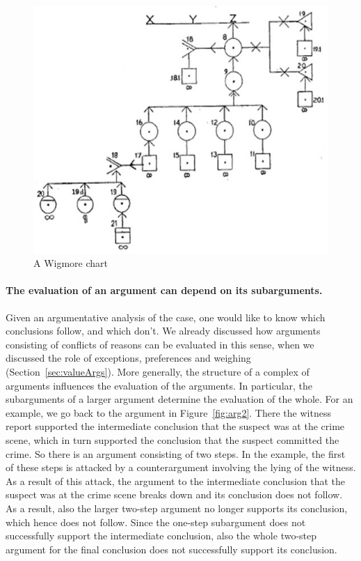 \documentclass[10pt]{article}
\begin{document}
\begin{figure}[bt]
	\centering
		\includegraphics[scale=0.7]{img/wigmore.jpg}
\caption{A Wigmore chart\label{fig:wigmore}}
\end{figure}

\paragraph{The evaluation of an argument can depend on its subarguments.}Given an argumentative analysis of the case, one would like to know which conclusions follow, and which don't. We already discussed how arguments consisting of conflicts of reasons can be evaluated in this sense, when we discussed the role of exceptions, preferences and weighing (Section~\ref{sec:valueArgs}). More generally, the structure of a complex of arguments influences the evaluation of the arguments. In particular, the subarguments of a larger argument determine the evaluation of the whole. For an example, we go back to the argument in Figure~\ref{fig:arg2}. There the witness report supported the intermediate conclusion that the suspect was at the crime scene, which in turn supported the conclusion that the suspect committed the crime. So there is an argument consisting of two steps. In the example, the first of these steps is attacked by a counterargument involving the lying of the witness. As a result of this attack, the argument to the intermediate conclusion that the suspect was at the crime scene breaks down and its conclusion does not follow. As a result, also the larger two-step argument no longer supports its conclusion, which hence does not follow. Since the one-step subargument does not successfully support the intermediate conclusion, also the whole two-step argument for the final conclusion does not successfully support its conclusion.
\end{document}
